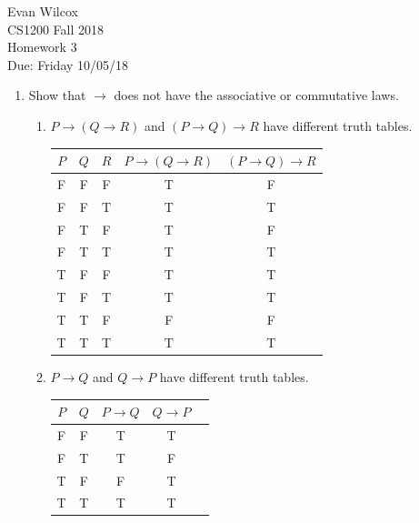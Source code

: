 \documentclass{article}
\begin{document}
\begin{flushleft}
Evan Wilcox\\
CS1200 Fall 2018\\
Homework 3\\
Due: Friday 10/05/18
\end{flushleft}

\begin{enumerate}
    
    \item Show that $\rightarrow$ does not have the associative or 
    commutative laws.
    \begin{enumerate}
        
        \item $P \rightarrow (Q \rightarrow R)$ and $(P \rightarrow Q) \rightarrow R$ have different truth tables.\\
        \begin{tabular}{ |c|c|c|c|c| } 
            \hline
            $P$ & $Q$ & $R$ & $P \rightarrow (Q \rightarrow R)$ & $(P \rightarrow Q) \rightarrow R$\\ 
            \hline
            F & F & F & T & F\\ 
            \hline
            F & F & T & T & T\\ 
            \hline
            F & T & F & T & F\\ 
            \hline
            F & T & T & T & T\\ 
            \hline
            T & F & F & T & T\\ 
            \hline
            T & F & T & T & T\\ 
            \hline
            T & T & F & F & F\\ 
            \hline
            T & T & T & T & T\\ 
            \hline
        \end{tabular}

        \item $P \rightarrow Q$ and $Q \rightarrow P$ have different truth tables.\\
        \begin{tabular}{ |c|c|c|c|c| } 
            \hline
            $P$ & $Q$ & $P \rightarrow Q$ & $Q \rightarrow P$\\ 
            \hline
            F & F & T & T\\ 
            \hline
            F & T & T & F\\ 
            \hline
            T & F & F & T\\ 
            \hline
            T & T & T & T\\ 
            \hline
        \end{tabular}
    \end{enumerate}
    

\end{enumerate}
\end{document}
